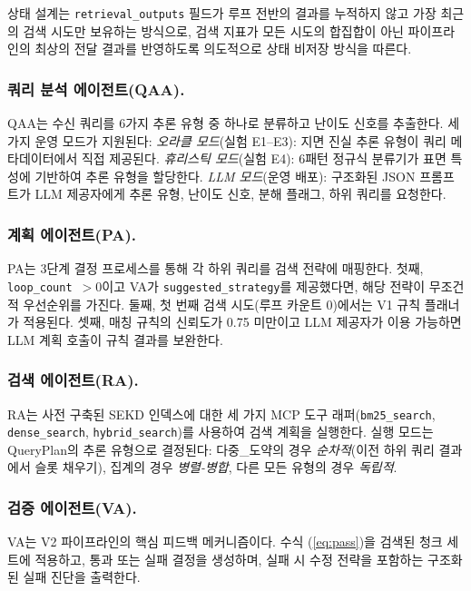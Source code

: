 \documentclass[11pt, a4paper]{article}
\begin{document}
상태 설계는 \texttt{retrieval\_outputs} 필드가 루프 전반의 결과를 누적하지 않고 가장 최근의 검색 시도만 보유하는 방식으로, 검색 지표가 모든 시도의 합집합이 아닌 파이프라인의 최상의 전달 결과를 반영하도록 의도적으로 상태 비저장 방식을 따른다.

\subsubsection*{쿼리 분석 에이전트(QAA).}

QAA는 수신 쿼리를 6가지 추론 유형 중 하나로 분류하고 난이도 신호를 추출한다. 세 가지 운영 모드가 지원된다: \textit{오라클 모드}(실험 E1--E3): 지면 진실 추론 유형이 쿼리 메타데이터에서 직접 제공된다. \textit{휴리스틱 모드}(실험 E4): 6패턴 정규식 분류기가 표면 특성에 기반하여 추론 유형을 할당한다. \textit{LLM 모드}(운영 배포): 구조화된 JSON 프롬프트가 LLM 제공자에게 추론 유형, 난이도 신호, 분해 플래그, 하위 쿼리를 요청한다.

\subsubsection*{계획 에이전트(PA).}

PA는 3단계 결정 프로세스를 통해 각 하위 쿼리를 검색 전략에 매핑한다. 첫째, \texttt{loop\_count}~$>0$이고 VA가 \texttt{suggested\_strategy}를 제공했다면, 해당 전략이 무조건적 우선순위를 가진다. 둘째, 첫 번째 검색 시도(루프 카운트 0)에서는 V1 규칙 플래너가 적용된다. 셋째, 매칭 규칙의 신뢰도가 0.75 미만이고 LLM 제공자가 이용 가능하면 LLM 계획 호출이 규칙 결과를 보완한다.

\subsubsection*{검색 에이전트(RA).}

RA는 사전 구축된 SEKD 인덱스에 대한 세 가지 MCP 도구 래퍼(\texttt{bm25\_search}, \texttt{dense\_search}, \texttt{hybrid\_search})를 사용하여 검색 계획을 실행한다. 실행 모드는 QueryPlan의 추론 유형으로 결정된다: 다중\_도약의 경우 \textit{순차적}(이전 하위 쿼리 결과에서 슬롯 채우기), 집계의 경우 \textit{병렬-병합}, 다른 모든 유형의 경우 \textit{독립적}.

\subsubsection*{검증 에이전트(VA).}

VA는 V2 파이프라인의 핵심 피드백 메커니즘이다. 수식 (\ref{eq:pass})을 검색된 청크 세트에 적용하고, 통과 또는 실패 결정을 생성하며, 실패 시 수정 전략을 포함하는 구조화된 실패 진단을 출력한다.
\end{document}
